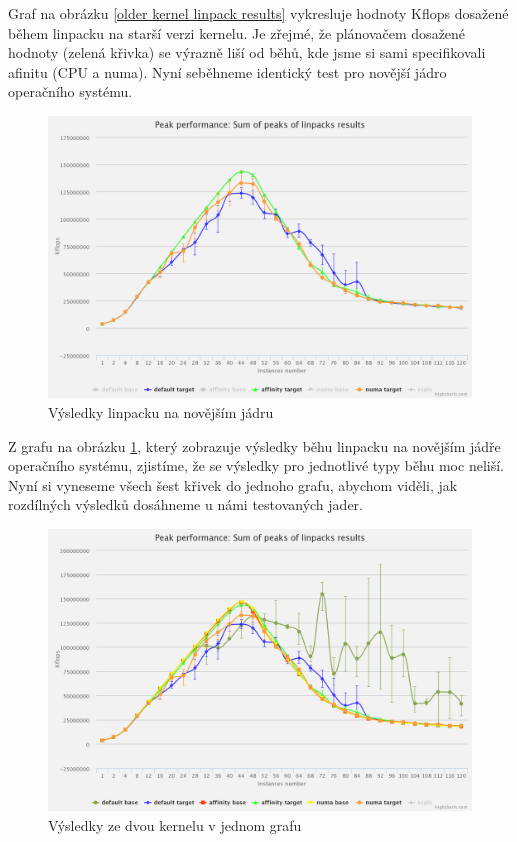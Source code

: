 \documentclass[
  field=ainfk,
  biblatex,
  glossaries,
  index
]{kidiplom}
\begin{document}
Graf na obrázku \ref{older kernel linpack results} vykresluje hodnoty Kflops dosažené během linpacku na starší verzi kernelu. Je zřejmé, že plánovačem dosažené hodnoty (zelená křivka) se výrazně liší od běhů, kde jsme si sami specifikovali afinitu (CPU a numa). Nyní seběhneme identický test pro novější jádro operačního systému.

\begin{figure}[ht]
\center
\includegraphics[scale=0.16]{obrazky/LinpackTargetChart.png}
\caption{Výsledky linpacku na novějším jádru}
\label{newer kernel linpack results}
\end{figure}

Z grafu na obrázku \ref{newer kernel linpack results}, který zobrazuje výsledky běhu linpacku na novějším jádře operačního systému,  zjistíme, že se výsledky pro jednotlivé typy běhu moc neliší. Nyní si vyneseme všech šest křivek do jednoho grafu, abychom viděli, jak rozdílných výsledků dosáhneme u námi testovaných jader. 

\begin{figure}[ht]
\center
\includegraphics[scale=0.2]{obrazky/LinpackSumChart.png}
\caption{Výsledky ze dvou kernelu v jednom grafu}
\label{both kernels linpack results}
\end{figure}
\end{document}
